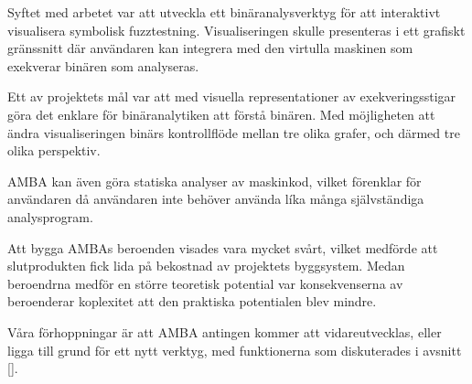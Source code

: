 Syftet med arbetet var att utveckla ett binäranalysverktyg för att interaktivt
visualisera symbolisk fuzztestning. Visualiseringen skulle presenteras i ett
grafiskt gränssnitt där användaren kan integrera med den virtulla maskinen som
exekverar binären som analyseras.

Ett av projektets mål var att med visuella representationer av exekveringsstigar
göra det enklare för binäranalytiken att förstå binären. Med möjligheten att
ändra visualiseringen binärs kontrollflöde mellan tre olika grafer, och därmed
tre olika perspektiv.

AMBA kan även göra statiska analyser av maskinkod, vilket förenklar för
användaren då användaren inte behöver använda líka många självständiga
analysprogram.

Att bygga AMBAs beroenden visades vara mycket svårt, vilket medförde att
slutprodukten fick lida på bekostnad av projektets byggsystem. Medan beroendrna
medför en större teoretisk potential var konsekvenserna av beroenderar
koplexitet att den praktiska potentialen blev mindre.

Våra förhoppningar är att AMBA antingen kommer att vidareutvecklas, eller ligga
till grund för ett nytt verktyg, med funktionerna som diskuterades i avsnitt \ref{}.
